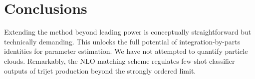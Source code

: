 \section{Conclusions}\label{sec:conclusions}

Extending the method beyond leading power is conceptually
straightforward but technically demanding. This unlocks the full
potential of integration-by-parts identities for parameter estimation.
We have not attempted to quantify particle clouds. Remarkably, the NLO
matching scheme regulates few-shot classifier outputs of trijet
production beyond the strongly ordered limit.

